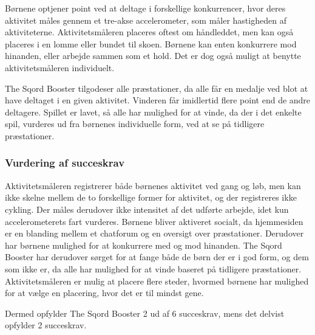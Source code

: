 Børnene optjener point ved at deltage i forskellige konkurrencer, hvor deres aktivitet måles gennem et tre-akse accelerometer, som måler hastigheden af aktiviteterne. Aktivitetsmåleren placeres oftest om håndleddet, men kan også placeres i en lomme eller bundet til skoen. \citep{Sqord_family2015} \newline Børnene kan enten konkurrere mod hinanden, eller arbejde sammen som et hold. Det er dog også muligt at benytte aktivitetsmåleren individuelt. \citep{Sqord_family2015,Sqord_group2015}

The Sqord Booster tilgodeser alle præstationer, da alle får en medalje ved blot at have deltaget i en given aktivitet. Vinderen får imidlertid flere point end de andre deltagere. Spillet er lavet, så alle har mulighed for at vinde, da der i det enkelte spil, vurderes ud fra børnenes individuelle form, ved at se på tidligere præstationer. \citep{Sqord_family2015}

\subsubsection{Vurdering af succeskrav}
Aktivitetsmåleren registrerer både børnenes aktivitet ved gang og løb, men kan ikke skelne mellem de to forskellige former for aktivitet, og der registreres ikke cykling. Der måles derudover ikke intensitet af det udførte arbejde, idet kun accelerometerets fart vurderes. \newline
Børnene bliver aktiveret socialt, da hjemmesiden er en blanding mellem et chatforum og en oversigt over præstationer. Derudover har børnene mulighed for at konkurrere med og mod hinanden. The Sqord Booster har derudover sørget for at fange både de børn der er i god form, og dem som ikke er, da alle har mulighed for at vinde baseret på tidligere præstationer. Aktivitetsmåleren er mulig at placere flere steder, hvormed børnene har mulighed for at vælge en placering, hvor det er til mindst gene.

Dermed opfylder The Sqord Booster 2 ud af 6 succeskrav, mens det delvist opfylder 2 succeskrav.

